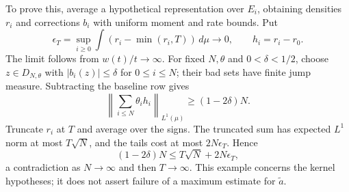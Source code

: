 \documentclass{article}
\newcommand{\dd}{\,d}
\begin{document}
To prove this, average a hypothetical representation over $E_i$, obtaining densities $r_i$ and corrections $b_i$ with uniform moment and rate bounds. Put
\[
 \epsilon_T=\sup_{i\ge0}\int(r_i-\min(r_i,T))\dd\mu\longrightarrow0,
 \qquad h_i=r_i-r_0.
\]
The limit follows from $w(t)/t\to\infty$. For fixed $N,\theta$ and $0<\delta<1/2$, choose $z\in D_{N,\theta}$ with $|b_i(z)|\le\delta$ for $0\le i\le N$; their bad sets have finite jump measure. Subtracting the baseline row gives
\[
 \left\|\sum_{i\le N}\theta_i h_i\right\|_{L^1(\mu)}
 \ge(1-2\delta)N.
\]
Truncate $r_i$ at $T$ and average over the signs. The truncated sum has expected $L^1$ norm at most $T\sqrt N$, and the tails cost at most $2N\epsilon_T$. Hence
\[
 (1-2\delta)N\le T\sqrt N+2N\epsilon_T,
\]
a contradiction as $N\to\infty$ and then $T\to\infty$. This example concerns the kernel hypotheses; it does not assert failure of a maximum estimate for $\widetilde a$.
\end{document}
